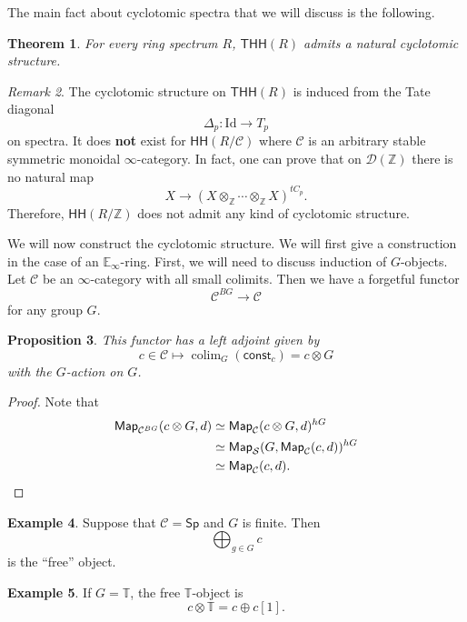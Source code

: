 \documentclass[10pt, oneside]{memoir}
\newtheorem{thm}{Theorem}[subsection]
\newtheorem{prop}[thm]{Proposition}
\theoremstyle{definition}
\newtheorem{exm}[thm]{Example}
\theoremstyle{remark}
\newtheorem{rmk}[thm]{Remark}
\theoremstyle{plain}
\theoremstyle{definition}
\theoremstyle{remark}
\newcommand{\Z}{\mathbb{Z}}
\newcommand{\E}{\mathbb{E}}
\newcommand{\mc}[1]{\mathcal{#1}}
\newcommand{\T}{\mathbb{T}}
\newcommand{\mr}[1]{\mathrm{#1}}
\newcommand{\ms}[1]{\mathsf{#1}}
\newcommand{\1}{\mathbf{1}}
\newcommand{\2}{\mathbf{2}}
\newcommand{\3}{\mathbf{3}}
\newcommand{\THH}{\ms{THH}}
\newcommand{\HH}{\ms{HH}}
\DeclareMathOperator*{\colim}{colim}
\begin{document}
The main fact about cyclotomic spectra that we will discuss is the following.
\begin{thm}
    For every ring spectrum $R$, $\THH(R)$ admits a natural cyclotomic structure.
\end{thm}

\begin{rmk}
    The cyclotomic structure on $\THH(R)$ is induced from the Tate diagonal
    \[ \Delta_p \colon \mr{Id} \to T_p \]
    on spectra. It does \textbf{not} exist for $\HH(R/\mc{C})$ where $\mc{C}$ is an arbitrary stable symmetric monoidal $\infty$-category. In fact, one can prove that on $\mc{D}(\Z)$ there is no natural map
    \[ X \to (X \otimes_{\Z} \cdots \otimes_{\Z} X)^{t C_p}. \]
    Therefore, $\HH(R/\Z)$ does not admit any kind of cyclotomic structure.
\end{rmk}

We will now construct the cyclotomic structure. We will first give a construction in the case of an $\E_{\infty}$-ring. First, we will need to discuss induction of $G$-objects. Let $\mc{C}$ be an $\infty$-category with all small colimits. Then we have a forgetful functor
\[ \mc{C}^{BG} \to \mc{C} \]
for any group $G$.

\begin{prop}
    This functor has a left adjoint given by
    \[ c \in \mc{C} \mapsto \colim_G (\ms{const}_c) = c \otimes G \]
    with the $G$-action on $G$.
\end{prop}

\begin{proof}
    Note that
    \begin{align*}
        \ms{Map}_{\mc{C}^{BG}}(c \otimes G, d) &\simeq \ms{Map}_{\mc{C}}(c \otimes G, d)^{hG} \\
        &\simeq \ms{Map}_{\mc{S}}(G, \ms{Map}_{\mc{C}}(c, d))^{hG} \\
        &\simeq \ms{Map}_{\mc{C}}(c, d). \qedhere
    \end{align*}
\end{proof}

\begin{exm}
    Suppose that $\mc{C} = \ms{Sp}$ and $G$ is finite. Then 
    \[ \bigoplus_{g \in G} c \]
    is the ``free'' object.
\end{exm}

\begin{exm}
    If $G = \T$, the free $\T$-object is
    \[ c \otimes \T = c \oplus c[1]. \]
\end{exm}
\end{document}
